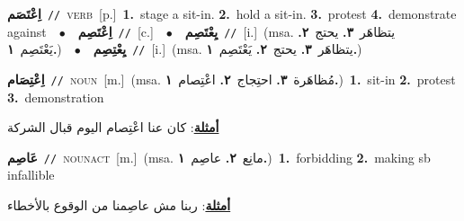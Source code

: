 \documentclass[10pt,a4paper,twoside]{article} %
\begin{document}
\begin{multicols}{2}
{\setlength\topsep{0pt}\textbf{\foreignlanguage{arabic}{اِعْتَصَم}}\ {\color{gray}\texttt{//}\color{black}}\ \textsc{verb}\ [p.]\ \textbf{1.}~stage a sit-in.  \textbf{2.}~hold a sit-in.  \textbf{3.}~protest  \textbf{4.}~demonstrate against\ \ $\bullet$\ \ \setlength\topsep{0pt}\textbf{\foreignlanguage{arabic}{اِعْتَصِم}}\ {\color{gray}\texttt{//}\color{black}}\ [c.]\ \ $\bullet$\ \ \setlength\topsep{0pt}\textbf{\foreignlanguage{arabic}{يِعْتَصِم}}\ {\color{gray}\texttt{//}\color{black}}\ [i.]\ \color{gray}(msa. \foreignlanguage{arabic}{يتظاهَر}~\foreignlanguage{arabic}{\textbf{٣.}}  \foreignlanguage{arabic}{يحتج}~\foreignlanguage{arabic}{\textbf{٢.}}  \foreignlanguage{arabic}{يَعْتَصِم}~\foreignlanguage{arabic}{\textbf{١.}})\color{black}\ \ $\bullet$\ \ \setlength\topsep{0pt}\textbf{\foreignlanguage{arabic}{يِعْتِصِم}}\ {\color{gray}\texttt{//}\color{black}}\ [i.]\ \color{gray}(msa. \foreignlanguage{arabic}{يتظاهَر}~\foreignlanguage{arabic}{\textbf{٣.}}  \foreignlanguage{arabic}{يحتج}~\foreignlanguage{arabic}{\textbf{٢.}}  \foreignlanguage{arabic}{يَعْتَصِم}~\foreignlanguage{arabic}{\textbf{١.}})\color{black}\ } \vspace{2mm}

{\setlength\topsep{0pt}\textbf{\foreignlanguage{arabic}{اِعْتِصَام}}\ {\color{gray}\texttt{//}\color{black}}\ \textsc{noun}\ [m.]\ \color{gray}(msa. \foreignlanguage{arabic}{مُظاهَرة}~\foreignlanguage{arabic}{\textbf{٣.}}  \foreignlanguage{arabic}{احتِجاج}~\foreignlanguage{arabic}{\textbf{٢.}}  \foreignlanguage{arabic}{اعْتِصام}~\foreignlanguage{arabic}{\textbf{١.}})\color{black}\ \textbf{1.}~sit-in  \textbf{2.}~protest  \textbf{3.}~demonstration\  \begin{flushright}\color{gray}\foreignlanguage{arabic}{\textbf{\underline{\foreignlanguage{arabic}{أمثلة}}}: كان عنا اعْتِصام اليوم قبال الشركة}\end{flushright}\color{black}} \vspace{2mm}

{\setlength\topsep{0pt}\textbf{\foreignlanguage{arabic}{عَاصِم}}\ {\color{gray}\texttt{//}\color{black}}\ \textsc{noun\textunderscore act}\ [m.]\ \color{gray}(msa. \foreignlanguage{arabic}{مانِع}~\foreignlanguage{arabic}{\textbf{٢.}}  \foreignlanguage{arabic}{عاصِم}~\foreignlanguage{arabic}{\textbf{١.}})\color{black}\ \textbf{1.}~forbidding  \textbf{2.}~making sb infallible\  \begin{flushright}\color{gray}\foreignlanguage{arabic}{\textbf{\underline{\foreignlanguage{arabic}{أمثلة}}}: ربنا مش عاصِمنا من الوقوع بالأخطاء}\end{flushright}\color{black}} \vspace{2mm}


\end{multicols}
\end{document}
